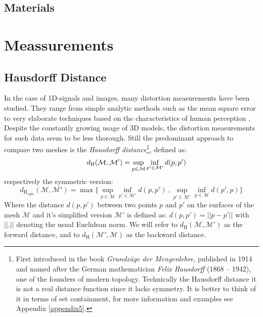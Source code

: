 \subsection{Materials}
\label{topstoc44}

\newpage
\section{Meassurements}
\label{topstoc5}

\subsection{Hausdorff Distance}
\label{topstoc51}

In the case of 1D-signals and images, many distortion measurements have been studied.
They range from simple analytic methods such as the mean square error to very elaborate techniques based on the characteristics of human perception \citep[cf.][]{Winkler2001}.
Despite the constantly growing usage of 3D models, the distortion measurements for such data seem to be less thorough.
Still the predominant approach to compare two meshes is the \textit{Hausdorff distance}\footnote{ First introduced in the book \textit{Grundzüge der Mengenlehre}, published in 1914 and named after the German mathematician \textit{Felix Hausdorff} (1868 – 1942), one of the founders of modern topology. Technically the Hausdorff distance it is not a real distance function since it lacks symmetry. It is better to think of it in terms of set containment, for more information and examples see Appendix \ref{appendix5}.}, defined as:
\begin{equation} \label{eq:hausdorff}
\hspace*{0.5cm} d_{\mathrm H}(\mathcal{M},\mathcal{M}') = \sup_{p \in \mathcal{M}} \inf_{p' \in \mathcal{M}'} d(p, p')
\end{equation}
respectively the symmetric version:
\begin{equation}
d_{\mathrm H_{sym}}(\mathcal{M},\mathcal{M}') = \max \{\sup_{p \in \mathcal{M}} \inf_{p' \in \mathcal{M}'} d(p, p')~, \sup_{p' \in \mathcal{M}'} \inf_{p \in \mathcal{M}} d(p', p)\}
\end{equation}
Where the distance $d(p, p')$ between two points $p$ and $p'$ on the surfaces of the mesh $\mathcal{M}$ and it's simplified version $\mathcal{M}'$ is defined as: $d(p, p') = || p-p' ||$ with $||.||$ denoting the usual Euclidean norm.
We will refer to $d_{\mathrm H}(\mathcal{M},\mathcal{M}')$ as the forward distance, and to $d_{\mathrm H}(\mathcal{M}',\mathcal{M})$ as the backward distance.\\
